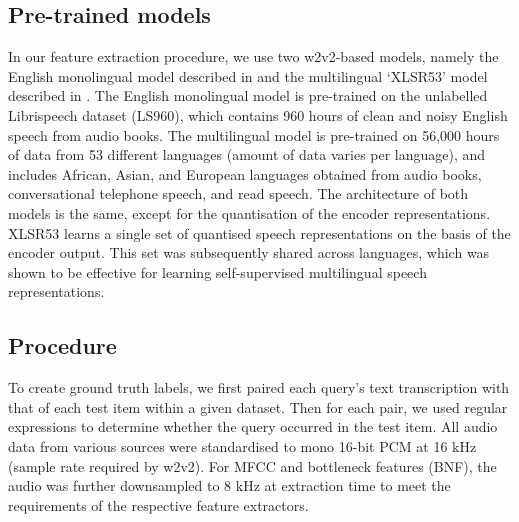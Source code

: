 \documentclass{article}
\begin{document}
\subsection{Pre-trained models}

In our feature extraction procedure, we use two w2v2-based models, namely the English monolingual model described in \cite{baevskiWav2vecFrameworkSelfsupervisedtoappear} and the multilingual `XLSR53' model described in \cite{conneau2020unsupervised}.
The English monolingual model is pre-trained on the unlabelled Librispeech dataset (LS960), which contains 960 hours of clean and noisy English speech from audio books.
The multilingual model is pre-trained on 56,000 hours of data from 53 different languages (amount of data varies per language), and includes African, Asian, and European languages obtained from audio books, conversational telephone speech, and read speech.
The architecture of both models is the same, except for the quantisation of the encoder representations.
XLSR53 learns a single set of quantised speech representations on the basis of the encoder output.
This set was subsequently shared across languages, which was shown to be effective for learning self-supervised multilingual speech representations.

\subsection{Procedure}

To create ground truth labels, we first paired each query's text transcription with that of each test item within a given dataset.
Then for each pair, we used regular expressions to determine whether the query occurred in the test item.
All audio data from various sources were standardised to mono 16-bit PCM at 16 kHz (sample rate required by w2v2).
For MFCC and bottleneck features (BNF), the audio was further downsampled to 8 kHz at extraction time to meet the requirements of the respective feature extractors.
\end{document}
